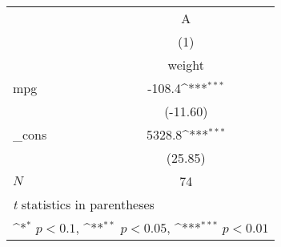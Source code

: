 \documentclass{article}
\begin{document}
{
\def\sym#1{\ifmmode^{#1}\else\(^{#1}\)\fi}
\begin{tabular}{l*{1}{c}}
\toprule
            &\multicolumn{1}{c}{A}\\\cmidrule(lr){2-2}
            &\multicolumn{1}{c}{(1)}\\
            &\multicolumn{1}{c}{weight}\\
\midrule
mpg         &      -108.4\sym{***}\\
            &    (-11.60)         \\
\addlinespace
\_cons      &      5328.8\sym{***}\\
            &     (25.85)         \\
\midrule
\(N\)       &          74         \\
\bottomrule
\multicolumn{2}{l}{\footnotesize \textit{t} statistics in parentheses}\\
\multicolumn{2}{l}{\footnotesize \sym{*} \(p<0.1\), \sym{**} \(p<0.05\), \sym{***} \(p<0.01\)}\\
\end{tabular}
}
\end{document}
